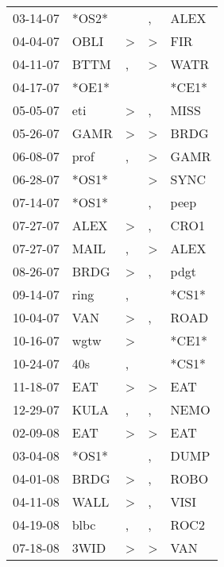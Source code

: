 \begin{supertabular}{lllll}
 03-14-07 &  *OS2* &                  &                , &   ALEX \\
 04-04-07 &   OBLI &     \textgreater &     \textgreater &    FIR \\
 04-11-07 &   BTTM &                , &     \textgreater &   WATR \\
 04-17-07 &  *OE1* &                  &                  &  *CE1* \\
 05-05-07 &    eti &     \textgreater &                , &   MISS \\
 05-26-07 &   GAMR &     \textgreater &     \textgreater &   BRDG \\
 06-08-07 &   prof &                , &     \textgreater &   GAMR \\
 06-28-07 &  *OS1* &                  &     \textgreater &   SYNC \\
 07-14-07 &  *OS1* &                  &                , &   peep \\
 07-27-07 &   ALEX &     \textgreater &                , &   CRO1 \\
 07-27-07 &   MAIL &                , &     \textgreater &   ALEX \\
 08-26-07 &   BRDG &     \textgreater &                , &   pdgt \\
 09-14-07 &   ring &                , &                  &  *CS1* \\
 10-04-07 &    VAN &     \textgreater &                , &   ROAD \\
 10-16-07 &   wgtw &     \textgreater &                  &  *CE1* \\
 10-24-07 &    40s &                , &                  &  *CS1* \\
 11-18-07 &    EAT &     \textgreater &     \textgreater &    EAT \\
 12-29-07 &   KULA &                , &                , &   NEMO \\
 02-09-08 &    EAT &     \textgreater &     \textgreater &    EAT \\
 03-04-08 &  *OS1* &                  &                , &   DUMP \\
 04-01-08 &   BRDG &     \textgreater &                , &   ROBO \\
 04-11-08 &   WALL &     \textgreater &                , &   VISI \\
 04-19-08 &   blbc &                , &                , &   ROC2 \\
 07-18-08 &   3WID &     \textgreater &     \textgreater &    VAN \\

\end{supertabular}
